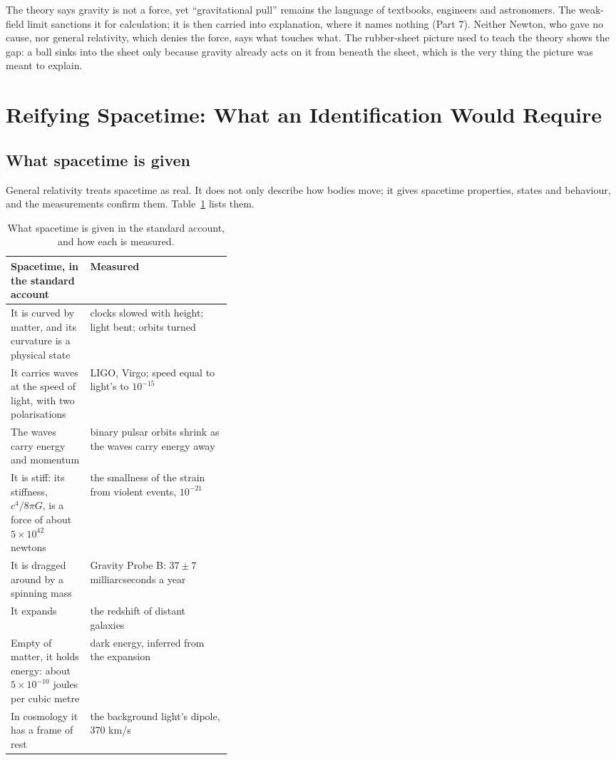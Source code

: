 \documentclass[11pt,a4paper]{article}
\begin{document}
 The theory says gravity is not a force, yet ``gravitational pull'' remains the language of textbooks, engineers and astronomers. The weak-field limit sanctions it for calculation; it is then carried into explanation, where it names nothing (Part 7). Neither Newton, who gave no cause, nor general relativity, which denies the force, says what touches what. The rubber-sheet picture used to teach the theory shows the gap: a ball sinks into the sheet only because gravity already acts on it from beneath the sheet, which is the very thing the picture was meant to explain.

\section{Reifying Spacetime: What an Identification Would Require}

\subsection{What spacetime is given}

General relativity treats spacetime as real. It does not only describe how bodies move; it gives spacetime properties, states and behaviour, and the measurements confirm them. Table~\ref{tab:given} lists them.

\begin{table}[t]\centering\small
\caption{What spacetime is given in the standard account, and how each is measured.}
\begin{tabularx}{\linewidth}{@{}>{\raggedright}p{0.36\linewidth} X@{}}\toprule
\textbf{Spacetime, in the standard account} & \textbf{Measured}\\\midrule
It is curved by matter, and its curvature is a physical state & clocks slowed with height; light bent; orbits turned \citep{will2014}\\
It carries waves at the speed of light, with two polarisations & LIGO, Virgo; speed equal to light's to $10^{-15}$ \citep{abbott2016,abbott2017speed}\\
The waves carry energy and momentum & binary pulsar orbits shrink as the waves carry energy away \citep{isaacson1968,weisberg2016}\\
It is stiff: its stiffness, $c^4/8\pi G$, is a force of about $5\times10^{42}$ newtons & the smallness of the strain from violent events, $10^{-21}$ \citep{tenev2018}\\
It is dragged around by a spinning mass & Gravity Probe B: $37\pm7$ milliarcseconds a year \citep{everitt2011}\\
It expands & the redshift of distant galaxies\\
Empty of matter, it holds energy: about $5\times10^{-10}$ joules per cubic metre & dark energy, inferred from the expansion \citep{planck2018vi}\\
In cosmology it has a frame of rest & the background light's dipole, 370 km/s \citep{fixsen2009}\\\bottomrule
\end{tabularx}\label{tab:given}\end{table}
\end{document}
